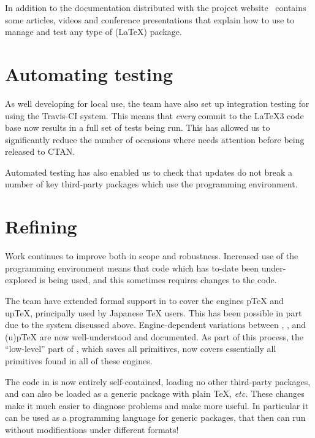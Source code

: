 \documentclass{ltnews}
\begin{document}
In addition to the documentation distributed with  the project
website~\cite[publications in 2014]{project-publications} contains
some articles, videos and conference presentations that explain how to
use  to manage and test any type of (\LaTeX{}) package.

\section{Automating  testing}

As well developing  for local use, the team have also set
up integration testing for  using the Travis-CI
system. This means that \emph{every} commit to the \LaTeX3 code base
now results in a full set of tests being run. This has allowed us to
significantly reduce the number of occasions where  needs
attention before being released to CTAN.

Automated testing has also enabled us to check that 
updates do not break a number of key third-party packages which use
the programming environment.

\section{Refining }

Work continues to improve  both in scope and robustness. Increased
use of the programming environment means that code which has to-date been
under-explored is being used, and this sometimes requires changes to the code.

The team have extended formal support in  to cover the engines
p\TeX{} and up\TeX{}, principally used by Japanese \TeX{} users. This has been
possible in part due to the  system discussed above.
Engine-dependent variations between , ,
 and (u)p\TeX{} are now well-understood and documented. As part
of this process, the \enquote{low-level} part of , which saves all
primitives, now covers essentially all primitives found in all of these
engines.

The code in  is now entirely self-contained, loading no
other third-party packages, and can also be loaded as a generic
package with plain \TeX{}, \emph{etc.} These changes make it much
easier to diagnose problems and make  more useful.
%
In particular it can be used as a programming language for generic
packages, that then can run without modifications under different
formats!
\end{document}
